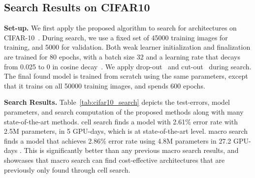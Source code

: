 



\subsection{Search Results on CIFAR10}
\label{sec:experiment_cifar10_search}

\textbf{Set-up.}
We first apply the proposed algorithm to search for architectures on CIFAR-10~\citep{cifar}. During search, we use a fixed set of 45000 training images for training, and 5000 for validation. Both weak learner initialization and finalization are trained for 80 epochs, with a batch size 32 and a learning rate that decays from 0.025 to 0 in cosine decay~\citep{cosine_lr}. We apply drop-out~\citep{larsson2016fractalnet} and cut-out~\citep{cutout} during search. The final found model is trained from scratch using the same parameters, except that it trains on all 50000 training images, and spends 600 epochs. 


\textbf{Search Results.} 
Table~\ref{tab:cifar10_search} depicts the test-errors, model parameters, and search computation of the proposed methods along with many state-of-the-art methods.
\Petridish cell search finds a model with 2.61\% error rate with 2.5M parameters, in 5 GPU-days, which is at  state-of-the-art level. \Petridish macro search finds a model that achieves 2.86\% error rate using 4.8M parameters in 27.2 GPU-days . This is significantly better than any previous macro search results, 
and showcases that macro search can find cost-effective architectures that are previously only found through cell search. 

